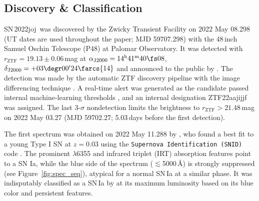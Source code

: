 \documentclass[twocolumn]{aastex631}
\newcommand{\sn}{SN\,2022joj}
\begin{document}
\begin{CJK*}{UTF8}{gbsn}
\subsection{Discovery \& Classification}
\sn\ was discovered by the Zwicky Transient Facility \citep[ZTF;][]{Bellm_ZTF_2019a,Graham_ZTF_2019,Dekany_ZTF_2020} on 2022 May 08.298 (UT dates are used throughout the paper; MJD 59707.298) with the 48\,inch Samuel Oschin Telescope (P48) at Palomar Observatory. It was detected with $r_\mathrm{ZTF}=19.13\pm0.06$\,mag at $\alpha_\mathrm{J2000}=14^\mathrm{h}41^\mathrm{m}40\fs08$, $\delta_\mathrm{J2000}=+03\degr00'24\farcs{14}$ and announced to the public by \citet{Fremling_2022TNSTR}. The detection was made by the automatic ZTF discovery pipeline \citep{Masci_ZTF_2019} with the image differencing technique \citep{Zackay_imagesub_2016}. A real-time alert \citep{Patterson_ZTFalert_2019} was generated as the candidate passed internal machine-learning thresholds \citep[e.g.,][]{Duev_ZTFML_2019,Mahabal_ZTFML_2019}, and an internal designation ZTF22aajijjf was assigned. The last 3-$\sigma$ nondetection limits the brightness to $r_\mathrm{ZTF}>21.48$\,mag on 2022 May 03.27 (MJD 59702.27; 5.03\,days before the first detection).

The first spectrum was obtained on 2022 May 11.288 by \citet{Newsome_2022TNSCR}, who found a best fit to a young Type I SN at $z=0.03$ using the \texttt{Supernova Identification (SNID)} code \citep{Blondin_SNID_2007}. The prominent  $\lambda$6355 and  infrared triplet (IRT) absorption features point to a SN Ia, while the blue side of the spectrum ($\lesssim$5000\,\r{A}) is strongly suppressed (see Figure~\ref{fig:spec_seq}), atypical for a normal SN\,Ia at a similar phase. It was indisputably classified as a SN\,Ia by \citet{Chu_2022TNSCR} at its maximum luminosity based on its blue color and persistent  features.


\end{CJK*}
\end{document}
